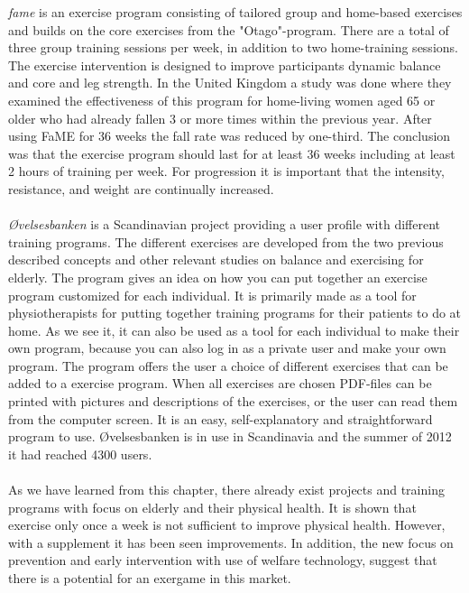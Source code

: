 \emph{\ac{fame}} is an exercise program consisting of tailored group and home-based exercises and builds on the core exercises from the "Otago"-program.  There are a total of three group training sessions per week, in addition to two home-training sessions. The exercise intervention is designed to improve participants dynamic balance and core and leg strength.  In the United Kingdom a study was done where they examined the effectiveness of this program for home-living women aged 65 or older who had already fallen 3 or more times within the previous year. After using FaME for 36 weeks the fall rate was reduced by one-third. The conclusion was that the exercise program should last for at least 36 weeks including at least 2 hours of training per week. For progression it is important that the intensity, resistance, and weight are continually increased.\cite{fame}\\ \\
\emph{{Ø}velsesbanken} is a Scandinavian project providing a user profile with different training programs. The different exercises are developed from the two previous described concepts and other relevant studies on balance and exercising for elderly. The program gives an idea on how you can put together an exercise program customized for each individual. It is primarily made as a tool for physiotherapists for putting together training programs for their patients to do at home. As we see it, it can also be used as a tool for each individual to make their own program, because you can also log in as a private user and make your own program. The program offers the user a choice of different exercises that can be added to a exercise program. When all exercises are chosen PDF-files can be printed with pictures and descriptions of the exercises, or the user can read them from the computer screen. It is an easy, self-explanatory and straightforward program to use. {Ø}velsesbanken is in use in Scandinavia and the summer of 2012 it had reached 4300 users. \cite{ovelsesbank}\\ \\
As we have learned from this chapter, there already exist projects and training programs with focus on elderly and their physical health. It is shown that exercise only once a week is not sufficient to improve physical health. However, with a supplement it has been seen improvements. In addition, the new focus on prevention and early intervention with use of welfare technology, suggest that there is a potential for an exergame in this market. 

